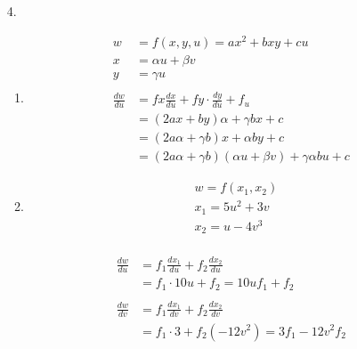\documentclass{./../../Latex/homework}
\begin{document}
\begin{enumerate}
\item[4.] \begin{enumerate}
\item
$$
\begin{aligned}
w &=f(x, y, u)=a x^{2}+b x y+c u \\
x &=\alpha u+\beta v \\
y &=\gamma u \\~\\
\frac{d w}{d u} &=f x \frac{d x}{d u}+f y \cdot \frac{d y}{d u}+f_{u} \\
&=(2 a x+b y) \alpha+\gamma b x+c \\
&=(2 a \alpha +\gamma b) x+\alpha b y+c \\
&=(2 a \alpha +\gamma b)(\alpha u+\beta v)+\gamma \alpha b u+c
\end{aligned}
$$
\item
$$
\begin{aligned}
&w=f\left(x_{1}, x_{2}\right) \\
&x_{1}=5 u^{2}+3 v \\
&x_{2}=u-4 v^{3}
\end{aligned}
$$ \\
$$
\begin{aligned}
\frac{d w}{d u} &=f_{1} \frac{d x_{1}}{d u}+f_{2} \frac{d x_{2}}{d u} \\
&=f_{1} \cdot 10 u+f_{2}=10 u f_{1}+f_{2} \\~\\
\frac{d w}{d v} &=f_{1} \frac{d x_{1}}{d v}+f_{2} \frac{d x_{2}}{d v} \\
&=f_{1} \cdot 3+f_{2}\left(-12 v^{2}\right)=3 f_{1}-12 v^{2} f_{2}
\end{aligned}
$$ \\
\end{enumerate}
\end{enumerate}
\end{document}
